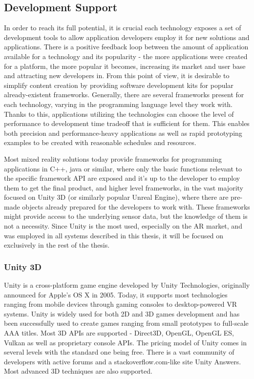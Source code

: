 \documentclass[12pt, a4paper]{article}
\newenvironment{definitions}
{\begin{description}[style=nextline]}
{\end{description}}
\begin{document}
\begin{definitions}
\end{definitions}


\subsection{Development Support}
In order to reach its full potential, it is crucial each technology exposes a set of development tools to allow application developers employ it for new solutions and applications. There is a positive feedback loop between the amount of application available for a technology and its popularity - the more applications were created for a platform, the more popular it becomes, increasing its market and user base and attracting new developers in. From this point of view, it is desirable to simplify content creation by providing software development kits for popular already-existent frameworks. Generally, there are several frameworks present for each technology, varying in the programming language level they work with. Thanks to this, applications utilizing the technologies can choose the level of performance to development time tradeoff that is sufficient for them. This enables both precision and performance-heavy applications as well as rapid prototyping examples to be created with reasonable schedules and resources.

Most mixed reality solutions today provide frameworks for programming applications in C++, java or similar, where only the basic functions relevant to the specific framework API are exposed and it’s up to the developer to employ them to get the final product, and higher level frameworks, in the vast majority focused on Unity 3D (or similarly popular Unreal Engine), where there are pre-made objects already prepared for the developers to work with. These frameworks might provide access to the underlying sensor data, but the knowledge of them is not a necessity. Since Unity is the most used, especially on the AR market, and was employed in all systems described in this thesis, it will be focused on exclusively in the rest of the thesis.

\subsubsection{Unity 3D}
Unity is a cross-platform game engine developed by Unity Technologies, originally announced for Apple’s OS X in 2005. Today, it supports most technologies ranging from mobile devices through gaming consoles to desktop-powered VR systems. Unity is widely used for both 2D and 3D games development and has been successfully used to create games ranging from small prototypes to full-scale AAA titles. Most 3D APIs are supported - Direct3D, OpenGL, OpenGL ES, Vulkan as well as proprietary console APIs. The pricing model of Unity comes in several levels with the standard one being free. There is a vast community of developers with active forums and a stackoverflow.com-like site Unity Answers. Most advanced 3D techniques are also supported.
\end{document}
